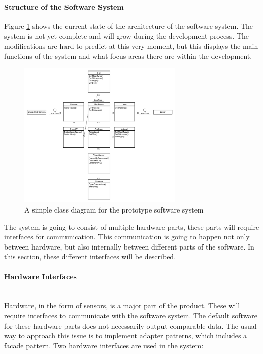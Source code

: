 \paragraph*{Structure of the Software System}
Figure \ref{ClassDiagram} shows the current state of the architecture of the software system. The system is not yet complete and will grow during the development process. The modifications are hard to predict at this very moment, but this displays the main functions of the system and what focus areas there are within the development. 
\begin{figure}[h!]
\centering
\includegraphics[width=0.7\textwidth]{graphics/ClassDiagram}
\caption{A simple class diagram for the prototype software system}
\label{ClassDiagram}
\end{figure}
The system is going to consist of multiple hardware parts, these parts will require interfaces for communication. This communication is going to happen not only between hardware, but also internally between different parts of the software.
In this section, these different interfaces will be described. 

\paragraph*{Hardware Interfaces}~\\
Hardware, in the form of sensors, is a major part of the product. These will require interfaces to communicate with the software system. The default software for these hardware parts does not necessarily output comparable data. The usual way to approach this issue is to implement adapter patterns, which includes a facade pattern. Two hardware interfaces are used in the system:

